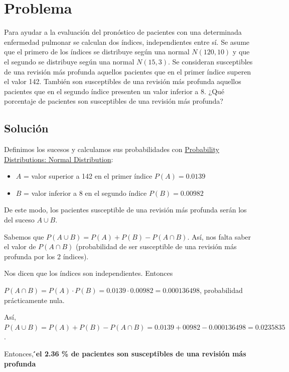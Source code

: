 \documentclass[
]{book}
\providecommand{\tightlist}{%
  \setlength{\itemsep}{0pt}\setlength{\parskip}{0pt}}
\begin{document}
\hypertarget{problema-13}{%
\section{Problema}\label{problema-13}}

Para ayudar a la evaluación del pronóstico de pacientes con una determinada enfermedad pulmonar se calculan dos índices, independientes entre sí. Se asume que el primero de los índices se distribuye según una normal \(N(120,10)\) y que el segundo se distribuye según una normal \(N(15,3)\). Se consideran susceptibles de una revisión más profunda aquellos pacientes que en el primer índice superen el valor 142. También son susceptibles de una revisión más profunda aquellos pacientes que en el segundo índice presenten un valor inferior a 8. ¿Qué porcentaje de pacientes son susceptibles de una revisión más profunda?

\hypertarget{soluciuxf3n-10}{%
\subsection{Solución}\label{soluciuxf3n-10}}

Definimos los sucesos y calculamos sus probabilidades con \href{https://homepage.divms.uiowa.edu/~mbognar/applets/normal.html}{Probability Distributions: Normal Distribution}:

\begin{itemize}
\tightlist
\item
  \(A\) = valor superior a 142 en el primer índice \(P(A)=0.0139\)
\item
  \(B\) = valor inferior a 8 en el segundo índice \(P(B)=0.00982\)
\end{itemize}

De este modo, los pacientes susceptible de una revisión más profunda serán los del suceso \(A \cup B\).

Sabemos que \(P(A \cup B)= P(A) + P(B) - P(A \cap B)\). Así, nos falta saber el valor de \(P(A \cap B)\) (probabilidad de ser susceptible de una revisión más profunda por los 2 índices).

Nos dicen que los índices son independientes. Entonces

\(P(A \cap B) = P(A) \cdot P(B) = 0.0139 \cdot 0.00982 = 0.000136498\), probabilidad prácticamente nula.

Así, \(P(A \cup B)= P(A) + P(B) - P(A \cap B) = 0.0139 + 00982 - 0.000136498 = 0.0235835\).

Entonces, \textbf{́el 2.36 \% de pacientes son susceptibles de una revisión más profunda}
\end{document}

